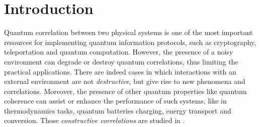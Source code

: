 \documentclass[entropy,article,submit,pdftex,moreauthors]{Definitions/mdpi}
\author{Federico Amato $^{1,\dagger,\ddagger}$\orcidA{}, Claudio Pellitteri $^{2,\ddagger}$, Salvatore Lorenzo $^{2,\ddagger}$, G. Massimo Palma $^{2,\ddagger}$ and Rosario Lo Franco $^{2,}$*}
\begin{document}



\section{Introduction}


Quantum correlation between two physical systems is one of the most important resources for implementing quantum information protocols, such as cryptography, teleportation and quantum computation. 
However, the presence of a noisy environment can degrade or destroy quantum correlations, thus limiting the practical applications. 
There are indeed cases in which interactions with an external environment are not \emph{destructive}, but give rise to new phenomena and correlations.
Moreover, the presence of other quantum properties like quantum coherence can assist or enhance the performance of such systems, like in thermodynamics tasks, quantum batteries charging, energy transport and conversion.
Those \emph{constructive correlations} are studied in \cite{apparent-temperatures}.
\end{document}
